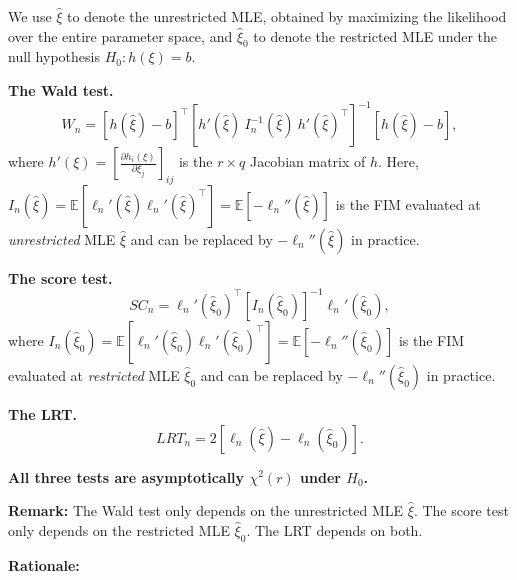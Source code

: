 \documentclass{article}
\newenvironment{mybox}{%
  \par\addvspace{10pt}%
  \begin{mdframed}[skipabove=0pt,skipbelow=10pt]%
}{%
  \end{mdframed}%
}
\theoremstyle{break}
\newcommand{\E}{\ensuremath{\mathbb{E}}}
\begin{document}
\begin{mybox}
We use $\hat\xi$ to denote the unrestricted MLE, obtained by maximizing the likelihood over the entire parameter space, and $\hat\xi_0$ to denote the restricted MLE under the null hypothesis $H_0: h(\xi)=b$.

\textbf{The Wald test.}
\begin{equation}\label{Wald-test}
    W_n = [h(\hat\xi) - b]^\top \left[h'(\hat\xi)\ I_n^{-1}(\hat\xi)\ h'(\hat\xi)^\top\right]^{-1} [h(\hat\xi) - b],
\end{equation}
where $h'(\xi) = \left[ \frac{\partial h_i(\xi)}{\partial \xi_j} \right]_{ij}$ is the $r\times q$ Jacobian matrix of $h$. Here, $I_n(\hat\xi) = \E[\ell_n'(\hat\xi) \ell_n'(\hat\xi)^\top] = \E[-\ell_n''(\hat\xi)]$ is the FIM evaluated at \emph{unrestricted} MLE $\hat\xi$ and can be replaced by $-\ell_n''(\hat\xi)$ in practice.

\textbf{The score test.}
\begin{equation}\label{Score-test}
    SC_n = \ell_n'(\hat\xi_0)^\top \left[ I_n(\hat\xi_0) \right]^{-1} \ell_n'(\hat\xi_0),
\end{equation}
where $I_n(\hat\xi_0) = \E[\ell_n'(\hat\xi_0) \ell_n'(\hat\xi_0)^\top] = \E[-\ell_n''(\hat\xi_0)]$ is the FIM evaluated at \emph{restricted} MLE $\hat\xi_0$ and can be replaced by $-\ell_n''(\hat\xi_0)$ in practice.

\textbf{The LRT.}
\begin{equation}\label{LR-test}
    LRT_n = 2[\ell_n(\hat\xi) - \ell_n(\hat\xi_0)].
\end{equation}
    
\textbf{All three tests are asymptotically $\chi^2(r)$ under $H_0$.}
\end{mybox}


\textbf{Remark:} 
The Wald test only depends on the unrestricted MLE $\hat{\xi}$.
The score test only depends on the restricted MLE $\hat\xi_0$.
The LRT depends on both.

\textbf{Rationale:}
\end{document}

